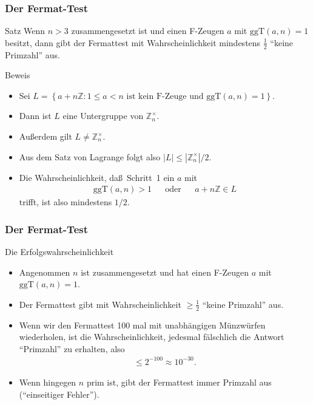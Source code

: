 \documentclass{beamer}
\newcommand\ZZ{\mathbb Z}
\newcommand\cbc[1]{\left\{{#1}\right\}}
\newcommand{\ggt}{\mathrm{ggT}}
\renewcommand{\ae}{\"a}
\newcommand{\ue}{\"u}
\begin{document}
\begin{frame}\frametitle{Der Fermat-Test}
	\begin{block}{Satz}
		Wenn $n>3$ zusammengesetzt ist und einen F-Zeugen $a$ mit $\ggt(a,n)=1$ besitzt, dann gibt der Fermattest mit Wahrscheinlichkeit mindestens $\frac{1}{2}$ ``keine Primzahl'' aus.
	\end{block}
	\begin{overprint}
		\begin{block}{Beweis}
			\begin{itemize}
				\item Sei $ L=\cbc{a+n\ZZ:1\leq a<n\mbox{ ist kein F-Zeuge und }\ggt(a,n)=1}.  $
				\item Dann ist $L$ eine Untergruppe von $\ZZ_n^\times$.
				\item Au\ss erdem gilt $L\neq\ZZ_n^\times$.
				\item Aus dem Satz von Lagrange folgt also $|L|\leq|\ZZ_n^\times|/2$.
				\item Die Wahrscheinlichkeit, da\ss\ Schritt~1 ein $a$ mit
					\begin{align*}
						\ggt(a,n)>1&&\mbox{oder}&&a+n\ZZ\in L
					\end{align*}
					trifft, ist also mindestens $1/2$.
			\end{itemize}
		\end{block}
	\end{overprint}
\end{frame}

\begin{frame}\frametitle{Der Fermat-Test}
	\begin{block}{Die Erfolgswahrscheinlichkeit}
			\begin{itemize}
				\item Angenommen $n$ ist zusammengesetzt und hat einen F-Zeugen $a$ mit $\ggt(a,n)=1$.
				\item Der Fermattest gibt mit Wahrscheinlichkeit $\geq\frac{1}{2}$ ``keine Primzahl'' aus.
				\item Wenn wir den Fermattest 100 mal mit unabh\ae ngigen M\ue nzw\ue rfen wiederholen, ist die Wahrscheinlichkeit, jedesmal f\ae lschlich die Antwort ``Primzahl'' zu erhalten, also
					\begin{align*}
						\leq 2^{-100}\approx 10^{-30}.
					\end{align*}
				\item Wenn hingegen $n$ prim ist, gibt der Fermattest \alert{immer} Primzahl aus (``einseitiger Fehler'').
			\end{itemize}
		\end{block}
\end{frame}
\end{document}
